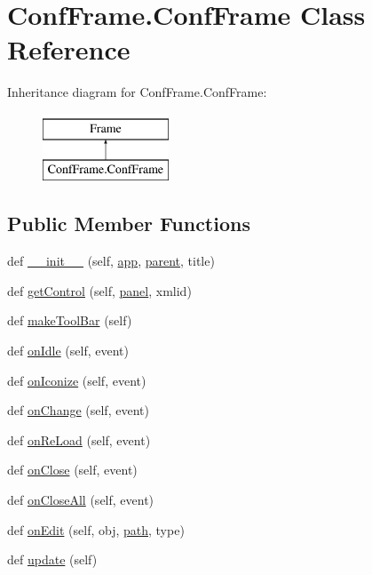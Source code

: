 \hypertarget{classConfFrame_1_1ConfFrame}{}\section{Conf\+Frame.\+Conf\+Frame Class Reference}
\label{classConfFrame_1_1ConfFrame}
Inheritance diagram for Conf\+Frame.\+Conf\+Frame\+:\begin{figure}[H]
\begin{center}
\leavevmode
\includegraphics[height=2.000000cm]{classConfFrame_1_1ConfFrame}
\end{center}
\end{figure}
\subsection*{Public Member Functions}
\begin{DoxyCompactItemize}
\item 
def \hyperlink{classConfFrame_1_1ConfFrame_addff8c48a5ddb190fed5105a4f70ca95}{\+\_\+\+\_\+init\+\_\+\+\_\+} (self, \hyperlink{classConfFrame_1_1ConfFrame_a533aacde2742b806cb8e8161a5360796}{app}, \hyperlink{classConfFrame_1_1ConfFrame_a1943cba9d33cfcae85f83c0777150288}{parent}, title)
\item 
def \hyperlink{classConfFrame_1_1ConfFrame_ab41502e0a899a8632e507df007d2fed8}{get\+Control} (self, \hyperlink{classConfFrame_1_1ConfFrame_aaca068730fdc7eb3f4ba7847bbb82329}{panel}, xmlid)
\item 
def \hyperlink{classConfFrame_1_1ConfFrame_ace0a1296b1331409d28e0751101e31d3}{make\+Tool\+Bar} (self)
\item 
def \hyperlink{classConfFrame_1_1ConfFrame_a82cf80e649080f468ad4d4de1a2d6b9a}{on\+Idle} (self, event)
\item 
def \hyperlink{classConfFrame_1_1ConfFrame_ade9e2d205fbe79ecc809d80233323387}{on\+Iconize} (self, event)
\item 
def \hyperlink{classConfFrame_1_1ConfFrame_a1f922c19035b3f3a5039ee438c3d4e36}{on\+Change} (self, event)
\item 
def \hyperlink{classConfFrame_1_1ConfFrame_a3d39db586535191174d87bb5aac11a47}{on\+Re\+Load} (self, event)
\item 
def \hyperlink{classConfFrame_1_1ConfFrame_a15511ec80bb3c5ce4a99aeb78af41c15}{on\+Close} (self, event)
\item 
def \hyperlink{classConfFrame_1_1ConfFrame_a6dea964103ba882eafed2c8735ab0a07}{on\+Close\+All} (self, event)
\item 
def \hyperlink{classConfFrame_1_1ConfFrame_aaec4c61352cd88fbb16f230df55cc4bc}{on\+Edit} (self, obj, \hyperlink{classConfFrame_1_1ConfFrame_a1f47cd72745073b992e1ccee6d1190d7}{path}, type)
\item 
def \hyperlink{classConfFrame_1_1ConfFrame_a09edd8c77d7a902e321a6cdecc41a769}{update} (self)
\end{DoxyCompactItemize}
